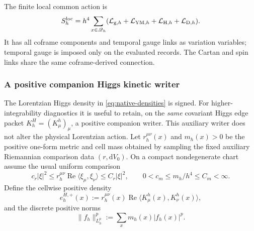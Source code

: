 \documentclass[11pt]{article}
\numberwithin{equation}{section}
\theoremstyle{definition}
\theoremstyle{remark}
\newcommand{\dd}{\mathrm d}
\newcommand{\Rea}{\operatorname{Re}}
\newcommand{\ip}[2]{\langle#1,#2\rangle}
\newcommand{\dV}{\dd V}
\begin{document}
The finite local common action is
\begin{equation}
 S_h^{\rm loc}=h^4\sum_{x\in\mathscr Q_h}
 (\mathcal L_{{\rm g},h}+\mathcal L_{{\rm YM},h}
 +\mathcal L_{{\rm H},h}+\mathcal L_{{\rm D},h}).
 \label{eq:native-local-action}
\end{equation}
It has all coframe components and temporal gauge links as variation variables; temporal gauge is imposed only on the evaluated records.  The Cartan and spin links share the same coframe-derived connection.

\subsubsection{A positive companion Higgs kinetic writer}
\label{app:positive-Higgs-envelope}

The Lorentzian Higgs density in \eqref{eq:native-densities} is signed.  For
higher-integrability diagnostics it is useful to retain, on the \emph{same}
covariant Higgs edge packet $K_h^H=(K^h_\mu)_\mu$, a positive companion
writer.  This auxiliary writer does not alter the physical Lorentzian action.
Let $r_h^{\mu\nu}(x)$ and $m_h(x)>0$ be the positive one-form metric and cell
mass obtained by sampling the fixed auxiliary Riemannian comparison data
$(r,\dV_0)$.  On a compact nondegenerate chart assume the usual uniform
comparison
\begin{equation}
 c_r|\xi|^2\le r_h^{\mu\nu}\Rea\ip{\xi_\mu}{\xi_\nu}
       \le C_r|\xi|^2,
 \qquad 0<c_m\le m_h/h^4\le C_m<\infty.
 \label{eq:positive-Higgs-Hodge-comparison}
\end{equation}
Define the cellwise positive density
\begin{equation}
 e_h^{H,+}(x)
 :=r_h^{\mu\nu}(x)\Rea\ip{K^h_\mu(x)}{K^h_\nu(x)},
 \label{eq:positive-Higgs-density}
\end{equation}
and the discrete positive norms
\begin{equation}
 \|f_h\|_{L_h^p}^p:=\sum_xm_h(x)|f_h(x)|^p.
 \label{eq:positive-discrete-Lp}
\end{equation}
\end{document}
